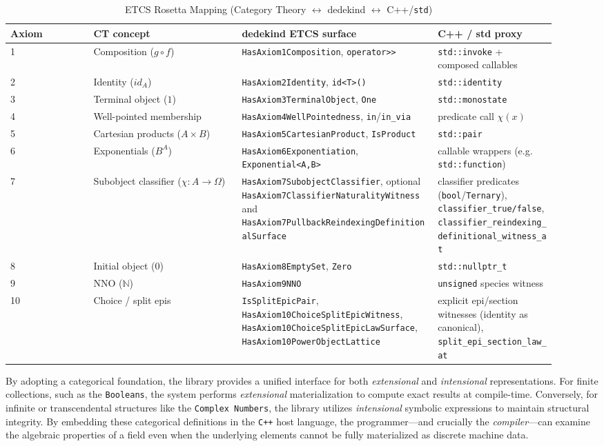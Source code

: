 \documentclass[11pt, a4paper]{report}
\begin{document}
\begin{table}[ht]
\centering
\caption{ETCS Rosetta Mapping (Category Theory $\leftrightarrow$ dedekind $\leftrightarrow$ C++/\texttt{std})}
\label{table:etcs_complete}
\begin{tabular}{p{0.14\linewidth}p{0.25\linewidth}p{0.33\linewidth}p{0.2\linewidth}}
\hline
\textbf{Axiom} & \textbf{CT concept} & \textbf{dedekind ETCS surface} & \textbf{C++ / std proxy} \\ \hline
1 & Composition ($g \circ f$) & \texttt{HasAxiom1Composition}, \texttt{operator>>} & \texttt{std::invoke} + composed callables \\
2 & Identity ($id_A$) & \texttt{HasAxiom2Identity}, \texttt{id<T>()} & \texttt{std::identity} \\
3 & Terminal object ($1$) & \texttt{HasAxiom3TerminalObject}, \texttt{One} & \texttt{std::monostate} \\
4 & Well-pointed membership & \texttt{HasAxiom4WellPointedness}, \texttt{in}/\texttt{in\_via} & predicate call $\chi(x)$ \\
5 & Cartesian products ($A \times B$) & \texttt{HasAxiom5CartesianProduct}, \texttt{IsProduct} & \texttt{std::pair} \\
6 & Exponentials ($B^A$) & \texttt{HasAxiom6Exponentiation}, \texttt{Exponential<A,B>} & callable wrappers (e.g. \texttt{std::function}) \\
7 & Subobject classifier ($\chi: A \to \Omega$) & \texttt{HasAxiom7SubobjectClassifier}, optional \texttt{HasAxiom7ClassifierNaturalityWitness} and \texttt{HasAxiom7PullbackReindexingDefinitionalSurface} & classifier predicates (\texttt{bool}/\texttt{Ternary}), \texttt{classifier\_true/false}, \texttt{classifier\_reindexing\_definitional\_witness\_at} \\
8 & Initial object ($0$) & \texttt{HasAxiom8EmptySet}, \texttt{Zero} & \texttt{std::nullptr\_t} \\
9 & NNO ($\mathbb{N}$) & \texttt{HasAxiom9NNO} & \texttt{unsigned} species witness \\
10 & Choice / split epis & \texttt{IsSplitEpicPair}, \texttt{HasAxiom10ChoiceSplitEpicWitness}, \texttt{HasAxiom10ChoiceSplitEpicLawSurface}, \texttt{HasAxiom10PowerObjectLattice} & explicit epi/section witnesses (identity as canonical), \texttt{split\_epi\_section\_law\_at} \\ \hline
\end{tabular}
\end{table}


By adopting a categorical foundation, the library provides a unified interface for both \emph{extensional} and \emph{intensional} representations.
For finite collections, such as the \texttt{Booleans}, the system performs \emph{extensional} materialization to compute exact results at compile-time.
Conversely, for infinite or transcendental structures like the \texttt{Complex Numbers}, the library utilizes \emph{intensional} symbolic expressions to maintain structural integrity.
By embedding these categorical definitions in the \texttt{C++} host language, the programmer—and crucially the \emph{compiler}—can examine the algebraic properties of a field even when the underlying elements cannot be fully materialized as discrete machine data.
\end{document}
